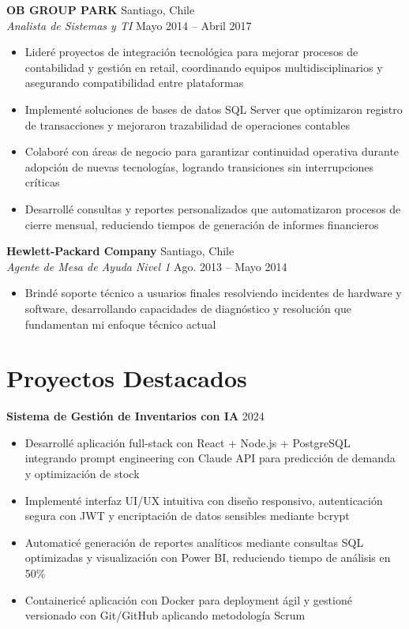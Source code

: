 \documentclass[11pt,letterpaper]{article}
\begin{document}
\vspace{2pt}
\textbf{OB GROUP PARK} \hfill Santiago, Chile\\
\textit{Analista de Sistemas y TI} \hfill Mayo 2014 – Abril 2017
\begin{itemize}
  \item Lideré proyectos de integración tecnológica para mejorar procesos de contabilidad y gestión en retail, coordinando equipos multidisciplinarios y asegurando compatibilidad entre plataformas
  \item Implementé soluciones de bases de datos SQL Server que optimizaron registro de transacciones y mejoraron trazabilidad de operaciones contables
  \item Colaboré con áreas de negocio para garantizar continuidad operativa durante adopción de nuevas tecnologías, logrando transiciones sin interrupciones críticas
  \item Desarrollé consultas y reportes personalizados que automatizaron procesos de cierre mensual, reduciendo tiempos de generación de informes financieros
\end{itemize}
\vspace{2pt}
\textbf{Hewlett-Packard Company} \hfill Santiago, Chile\\
\textit{Agente de Mesa de Ayuda Nivel 1} \hfill Ago. 2013 – Mayo 2014
\begin{itemize}
  \item Brindé soporte técnico a usuarios finales resolviendo incidentes de hardware y software, desarrollando capacidades de diagnóstico y resolución que fundamentan mi enfoque técnico actual
\end{itemize}

\section{Proyectos Destacados}

\textbf{Sistema de Gestión de Inventarios con IA} \hfill 2024
\begin{itemize}
  \item Desarrollé aplicación full-stack con React + Node.js + PostgreSQL integrando prompt engineering con Claude API para predicción de demanda y optimización de stock
  \item Implementé interfaz UI/UX intuitiva con diseño responsivo, autenticación segura con JWT y encriptación de datos sensibles mediante bcrypt
  \item Automaticé generación de reportes analíticos mediante consultas SQL optimizadas y visualización con Power BI, reduciendo tiempo de análisis en 50\%
  \item Containericé aplicación con Docker para deployment ágil y gestioné versionado con Git/GitHub aplicando metodología Scrum
\end{itemize}
\end{document}

